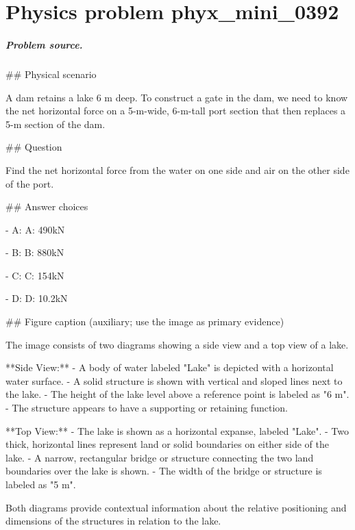 
\chapter{Physics problem phyx\_mini\_0392}
\label{ch:PhyXMiniProblems_problem_phyx_mini_0392}

\paragraph{Problem source.}
\#\# Physical scenario

A dam retains a lake 6 m deep. To construct a gate in the dam, we need to know the net horizontal force on a 5-m-wide, 6-m-tall port section that then replaces a 5-m section of the dam.

\#\# Question

Find the net horizontal force from the water on one side and air on the other side of the port.

\#\# Answer choices

- A: A: 490kN

- B: B: 880kN

- C: C: 154kN

- D: D: 10.2kN

\#\# Figure caption (auxiliary; use the image as primary evidence)

The image consists of two diagrams showing a side view and a top view of a lake.

**Side View:**
- A body of water labeled "Lake" is depicted with a horizontal water surface.
- A solid structure is shown with vertical and sloped lines next to the lake.
- The height of the lake level above a reference point is labeled as "6 m".
- The structure appears to have a supporting or retaining function.

**Top View:**
- The lake is shown as a horizontal expanse, labeled "Lake".
- Two thick, horizontal lines represent land or solid boundaries on either side of the lake.
- A narrow, rectangular bridge or structure connecting the two land boundaries over the lake is shown.
- The width of the bridge or structure is labeled as "5 m".

Both diagrams provide contextual information about the relative positioning and dimensions of the structures in relation to the lake.

